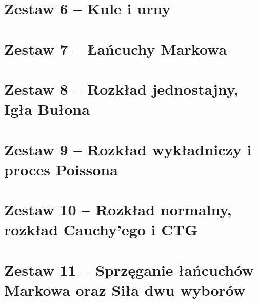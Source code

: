 \documentclass[12pt, a4paper, polish, openany]{book}
\begin{document}
\chapter{Zestaw 6 -- Kule i urny}
\graphicspath{{chapters/zestaw-06/}}


\chapter{Zestaw 7 -- Łańcuchy Markowa}
\graphicspath{{chapters/zestaw-07/}}


\chapter{Zestaw 8 -- Rozkład jednostajny, Igła Bułona}
\graphicspath{{chapters/zestaw-08/}}


\chapter{Zestaw 9 -- Rozkład wykładniczy i proces Poissona}
\graphicspath{{chapters/zestaw-09/}}


\chapter{Zestaw 10 -- Rozkład normalny, rozkład Cauchy'ego i CTG}
\graphicspath{{chapters/zestaw-10/}}


\chapter{Zestaw 11 -- Sprzęganie łańcuchów Markowa oraz Siła dwu wyborów}
\graphicspath{{chapters/zestaw-11/}}

\end{document}
